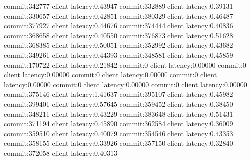 commit:342777 client latency:0.43947
commit:332889 client latency:0.39131
commit:330657 client latency:0.42851
commit:380329 client latency:0.46487
commit:377927 client latency:0.44676
commit:374444 client latency:0.40836
commit:368658 client latency:0.40550
commit:376873 client latency:0.51628
commit:368385 client latency:0.50051
commit:352992 client latency:0.43682
commit:349261 client latency:0.44393
commit:348581 client latency:0.45859
commit:170722 client latency:0.21842
commit:0 client latency:0.00000
commit:0 client latency:0.00000
commit:0 client latency:0.00000
commit:0 client latency:0.00000
commit:0 client latency:0.00000
commit:0 client latency:0.00000
commit:375146 client latency:1.41637
commit:395107 client latency:0.45982
commit:399401 client latency:0.57645
commit:359452 client latency:0.38450
commit:348211 client latency:0.43229
commit:383648 client latency:0.51431
commit:371194 client latency:0.45890
commit:362584 client latency:0.36009
commit:359510 client latency:0.40079
commit:354546 client latency:0.43353
commit:358155 client latency:0.33926
commit:357150 client latency:0.32840
commit:372058 client latency:0.40313